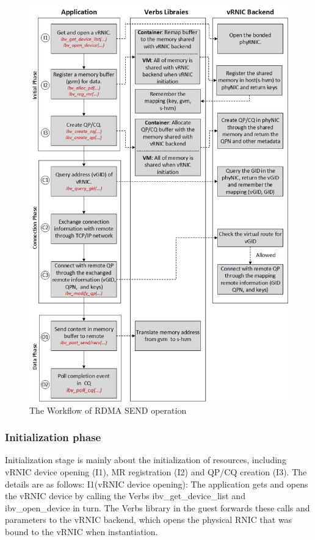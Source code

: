 \begin{figure}[!ht]
	\centering
	\includegraphics[width=1\linewidth]{images/RDMA-path.png}
	\caption{The Workflow of RDMA SEND operation}
	\label{fig:route-config}
\end{figure}

\subsubsection{Initialization phase}
Initialization stage is mainly about the initialization of resources, including vRNIC device opening (I1), MR registration (I2) and QP/CQ creation (I3). The details are as follows:
I1(vRNIC device opening): The application gets and opens the vRNIC device by calling the Verbs ibv\_get\_device\_list and ibv\_open\_device in turn. The Verbs library in the guest forwards these calls and parameters to the vRNIC backend, which opens the physical RNIC that was bound to the vRNIC when instantiation.

